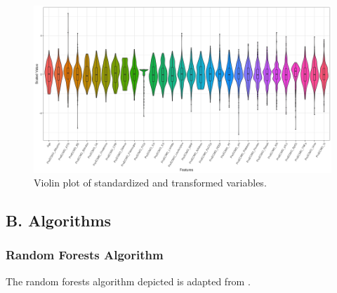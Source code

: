 \documentclass[12pt,]{article}
\begin{document}
\begin{figure}[H]

{\centering \includegraphics[width=1\linewidth]{images/violinplot_standardized} 

}

\caption{\label{fig.ensemble-imputation}Violin plot of standardized and transformed variables.}\label{fig:violin-yeojohnson}
\end{figure}

\subsection{B. Algorithms}\label{b.-algorithms}

\subsubsection{Random Forests Algorithm}\label{random-forests-algorithm}

The random forests algorithm depicted is adapted from
\citep{hastie_elements_2009}.
\end{document}
